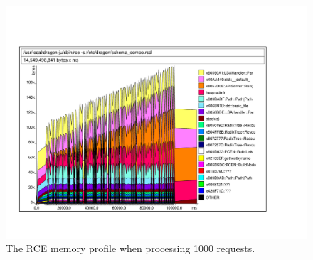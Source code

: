 \documentclass[10pt,a4paper]{report}
\begin{document}
\begin{figure}[!htbp]
  \begin{center}
    \includegraphics[angle=270,scale=0.70]{img/multi-1000}
    \caption[RCE memory profile (1000 requests)]{The RCE memory profile
      when processing 1000 requests.}
    \label{fig:multi-1000}
  \end{center}
\end{figure}
\end{document}
